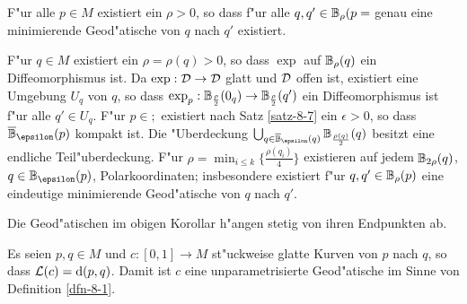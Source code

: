 \begin{Kor}\label{kor-8-8}
F"ur alle $p \in M$ existiert ein $\rho > 0$, so dass f"ur alle $q, q' \in \B_\rho(p=$ genau eine minimierende Geod"atische von $q$ nach $q'$ existiert.
\end{Kor}

\begin{bew}
F"ur $q \in M$ existiert ein $\rho = \rho(q) > 0$, so dass $\exp$ auf $\B_\rho(q)$ ein Diffeomorphismus ist. Da $\exp: \operatorname{\mathcal{D}} \to \operatorname{\mathcal{D}}$ glatt und $\operatorname{\mathcal{D}}$ offen ist, existiert eine Umgebung $U_q$ von $q$, so dass $\exp_p: \B_{\frac{\rho}{2}}(0_q) \to \B_{\frac{\rho}{2}}(q')$ ein Diffeomorphismus ist f"ur alle $q' \in U_q$. F"ur $p \in ;$ existiert nach Satz \ref{satz-8-7} ein $\epsilon > 0$, so dass $\overline \B_\epsilon(p)$ kompakt ist. Die "Uberdeckung $\bigcup_{q \in \overline \B_\epsilon(q)} \B_{\frac{\rho(q)}{2}}(q)$ besitzt eine endliche Teil"uberdeckung. F"ur $\rho = \min_{i \le k} \{ \frac{\rho(q_i)}{4} \}$ existieren auf jedem $\B_{2\rho}(q)$, $q \in \B_\epsilon(p)$, Polarkoordinaten; insbesondere existiert f"ur $q, q' \in \B_\rho(p)$ eine eindeutige minimierende Geod"atische von $q$ nach $q'$.
\end{bew}

\begin{bem}
Die Geod"atischen im obigen Korollar h"angen stetig von ihren Endpunkten ab.
\end{bem}

\begin{Kor}\label{kor-8-9}
Es seien $p, q \in M$ und $c: [0,1] \to M$ st"uckweise glatte Kurven von $p$ nach $q$, so dass $\operatorname{\mathcal{L}}(c) = \mathrm{d}(p,q)$. Damit ist $c$ eine unparametrisierte Geod"atische im Sinne von Definition \ref{dfn-8-1}.
\end{Kor}

